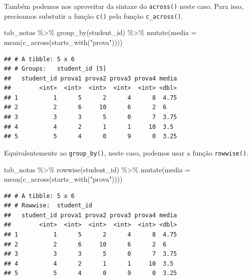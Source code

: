 \documentclass[
]{book}
\newenvironment{Shaded}{\begin{snugshade}}{\end{snugshade}}
\newcommand{\AttributeTok}[1]{\textcolor[rgb]{0.77,0.63,0.00}{#1}}
\newcommand{\FunctionTok}[1]{\textcolor[rgb]{0.00,0.00,0.00}{#1}}
\newcommand{\NormalTok}[1]{#1}
\newcommand{\SpecialCharTok}[1]{\textcolor[rgb]{0.00,0.00,0.00}{#1}}
\newcommand{\StringTok}[1]{\textcolor[rgb]{0.31,0.60,0.02}{#1}}
\begin{document}
Também podemos nos aproveitar da sintaxe do \texttt{across()} neste caso. Para isso, precisamos substutir a função \texttt{c()} pela função \texttt{c\_across()}.

\begin{Shaded}
\begin{Highlighting}[]
\NormalTok{tab\_notas }\SpecialCharTok{\%\textgreater{}\%}
  \FunctionTok{group\_by}\NormalTok{(student\_id) }\SpecialCharTok{\%\textgreater{}\%}
  \FunctionTok{mutate}\NormalTok{(}\AttributeTok{media =} \FunctionTok{mean}\NormalTok{(}\FunctionTok{c\_across}\NormalTok{(}\FunctionTok{starts\_with}\NormalTok{(}\StringTok{"prova"}\NormalTok{))))}
\end{Highlighting}
\end{Shaded}

\begin{verbatim}
## # A tibble: 5 x 6
## # Groups:   student_id [5]
##   student_id prova1 prova2 prova3 prova4 media
##        <int>  <int>  <int>  <int>  <int> <dbl>
## 1          1      5      2      4      8  4.75
## 2          2      6     10      6      2  6   
## 3          3      3      5      0      7  3.75
## 4          4      2      1      1     10  3.5 
## 5          5      4      0      9      0  3.25
\end{verbatim}

Equivalentemente ao \texttt{group\_by()}, neste caso, podemos usar a função \texttt{rowwise()}.

\begin{Shaded}
\begin{Highlighting}[]
\NormalTok{tab\_notas }\SpecialCharTok{\%\textgreater{}\%}
  \FunctionTok{rowwise}\NormalTok{(student\_id) }\SpecialCharTok{\%\textgreater{}\%}
  \FunctionTok{mutate}\NormalTok{(}\AttributeTok{media =} \FunctionTok{mean}\NormalTok{(}\FunctionTok{c\_across}\NormalTok{(}\FunctionTok{starts\_with}\NormalTok{(}\StringTok{"prova"}\NormalTok{))))}
\end{Highlighting}
\end{Shaded}

\begin{verbatim}
## # A tibble: 5 x 6
## # Rowwise:  student_id
##   student_id prova1 prova2 prova3 prova4 media
##        <int>  <int>  <int>  <int>  <int> <dbl>
## 1          1      5      2      4      8  4.75
## 2          2      6     10      6      2  6   
## 3          3      3      5      0      7  3.75
## 4          4      2      1      1     10  3.5 
## 5          5      4      0      9      0  3.25
\end{verbatim}
\end{document}
